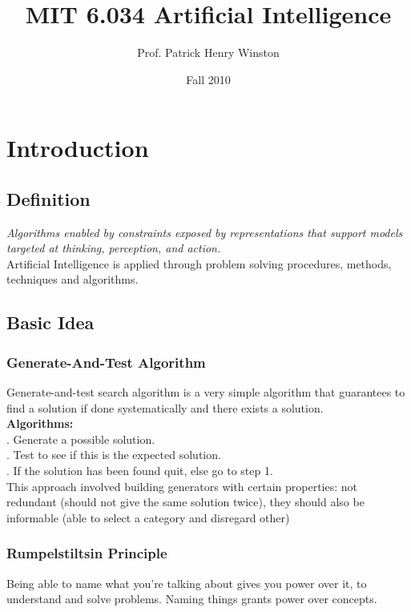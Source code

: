 \documentclass[12pt]{book}
\title{MIT 6.034 Artificial Intelligence}
\author{Prof. Patrick Henry Winston}
\date{Fall 2010}
\begin{document}
	\maketitle 
	\setcounter{tocdepth}{3}
	\tableofcontents
	\newpage


\section{Introduction} 
\subsection{Definition} %
\indent \textit{Algorithms enabled by constraints exposed by representations that support models targeted at thinking, perception, and action.}\\
\indent Artificial Intelligence is applied through problem solving procedures, methods, techniques and algorithms.
\subsection{Basic Idea}
\subsubsection{Generate-And-Test Algorithm}
\indent Generate-and-test search algorithm is a very simple algorithm that guarantees to find a solution if done systematically and there exists a solution.\\
\newline
\indent \textbf{Algorithms: }\\
\indent{}. Generate a possible solution.\\
\indent{}. Test to see if this is the expected solution.\\
\indent{}. If the solution has been found quit, else go to step 1.\\
\newline
\indent This approach involved building generators with certain properties: not redundant (should not give the same solution twice), they should also be informable (able to select a category and disregard other)
\subsubsection{Rumpelstiltsin Principle}
\indent Being able to name what you’re talking about gives you power over it, to understand and solve problems. Naming things grants power over concepts.
\end{document}
